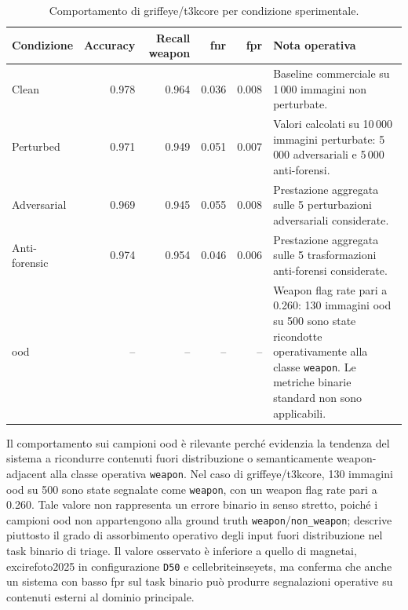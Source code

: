 \begin{table}[H]
\centering
\caption{Comportamento di \gls{griffeye}/\gls{t3kcore} per condizione sperimentale.}
\label{tab:results-griffeye-condition-metrics}
\small
\begin{tabularx}{\textwidth}{@{}l r r r r X@{}}
\toprule
\textbf{Condizione} &
\textbf{Accuracy} &
\textbf{Recall weapon} &
\textbf{\gls{fnr}} &
\textbf{\gls{fpr}} &
\textbf{Nota operativa} \\
\midrule

Clean &
0.978 &
0.964 &
0.036 &
0.008 &
Baseline commerciale su 1\,000 immagini non perturbate. \\

Perturbed &
0.971 &
0.949 &
0.051 &
0.007 &
Valori calcolati su 10\,000 immagini perturbate: 5\,000 adversariali e
5\,000 anti-forensi. \\

Adversarial &
0.969 &
0.945 &
0.055 &
0.008 &
Prestazione aggregata sulle 5 perturbazioni adversariali considerate. \\

Anti-forensic &
0.974 &
0.954 &
0.046 &
0.006 &
Prestazione aggregata sulle 5 trasformazioni anti-forensi considerate. \\

\gls{ood} &
-- &
-- &
-- &
-- &
Weapon flag rate pari a 0.260: 130 immagini \gls{ood} su 500 sono state
ricondotte operativamente alla classe \texttt{weapon}. Le metriche binarie
standard non sono applicabili. \\

\bottomrule
\end{tabularx}
\end{table}

Il comportamento sui campioni \gls{ood} è rilevante perché evidenzia la tendenza
del sistema a ricondurre contenuti fuori distribuzione o semanticamente
weapon-adjacent alla classe operativa \texttt{weapon}. Nel caso di
\gls{griffeye}/\gls{t3kcore}, 130 immagini \gls{ood} su 500 sono state
segnalate come \texttt{weapon}, con un weapon flag rate pari a 0.260. Tale
valore non rappresenta un errore binario in senso stretto, poiché i campioni
\gls{ood} non appartengono alla ground truth \texttt{weapon}/\texttt{non\_weapon};
descrive piuttosto il grado di assorbimento operativo degli input fuori
distribuzione nel task binario di triage. Il valore osservato è inferiore a
quello di \gls{magnetai}, \gls{excirefoto2025} in configurazione \texttt{D50} e
\gls{cellebriteinseyets}, ma conferma che anche un sistema con basso
\gls{fpr} sul task binario può produrre segnalazioni operative su contenuti
esterni al dominio principale.


